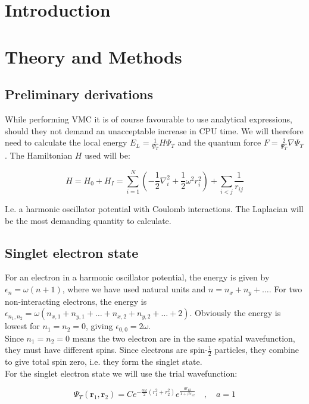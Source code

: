\documentclass[english, a4paper]{article}
\newcommand{\bm}[1]{\mathbf{#1}}
\begin{document}
	
	\section{Introduction}
	
	
	\section{Theory and Methods}
	\subsection{Preliminary derivations}
	While performing VMC it is of course favourable to use analytical expressions, should they not demand an unacceptable increase in CPU time. We will therefore need to calculate the local energy $E_L = \frac{1}{\Psi_T}H\Psi_T$ and the quantum force $F = \frac{2}{\Psi_T}\nabla\Psi_T$. The Hamiltonian $H$ used will be:
	
	\begin{equation}
	H = H_0 + H_I = \sum_{i=1}^{N}\left(-\frac{1}{2}\nabla_i^2 + \frac{1}{2}\omega^2r_i^2\right) + \sum_{i<j}\frac{1}{r_{ij}}
	\end{equation}
	
	I.e. a harmonic oscillator potential with Coulomb interactions. The Laplacian will be the most demanding quantity to calculate.
	
	\subsection{Singlet electron state}
	For an electron in a harmonic oscillator potential, the energy is given by $\epsilon_n = \omega(n + 1)$, where we have used natural units and $n = n_x + n_y + \ldots$. For two non-interacting electrons, the energy is $\epsilon_{n_1,n_2} = \omega(n_{x,1} + n_{y,1} + \ldots + n_{x,2} + n_{y,2} + \ldots + 2)$. Obviously the energy is lowest for $n_1 = n_2 = 0$, giving $\epsilon_{0,0} = 2\omega$.\\
	Since $n_1=n_2 = 0$ means the two electron are in the same spatial wavefunction, they must have different spins. 
	Since electrons are spin-$\frac{1}{2}$ particles, they combine to give total spin zero, i.e. they form the singlet state.\\
	
	For the singlet electron state we will use the trial wavefunction:
	
	\begin{equation}
	\Psi_T(\bm{r}_1,\bm{r}_2) = Ce^{-\frac{\alpha\omega}{2}(r_1^2+r_2^2)}e^{\frac{ar_{12}}{1+\beta r_{12}}}\quad,\quad a=1 \label{TwoBodyTrailWavefunction}
	\end{equation}
	
\end{document}
